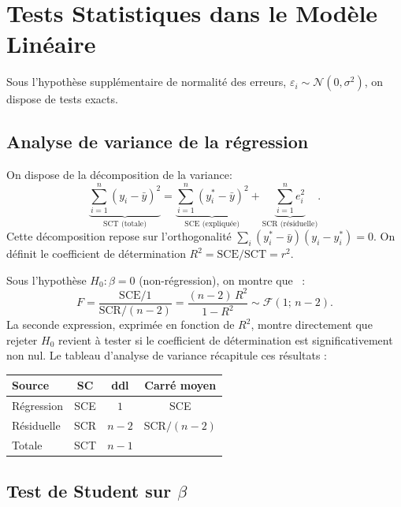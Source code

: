 \documentclass[12pt,a4paper]{article}
\theoremstyle{definition}
\theoremstyle{remark}
\newcommand{\ybar}{\bar{y}}
\begin{document}

\section{Tests Statistiques dans le Modèle Linéaire}
\label{sec:tests}

Sous l'hypothèse supplémentaire de normalité des erreurs,
$\varepsilon_i \sim \mathcal{N}(0, \sigma^2)$, on dispose de tests exacts.

\subsection{Analyse de variance de la régression}

On dispose de la décomposition de la variance:
\begin{equation}
  \label{eq:decomp}
  \underbrace{\sum_{i=1}^n (y_i - \ybar)^2}_{\text{SCT (totale)}}
  =
  \underbrace{\sum_{i=1}^n (y_i^* - \ybar)^2}_{\text{SCE (expliquée)}}
  +
  \underbrace{\sum_{i=1}^n e_i^2}_{\text{SCR (résiduelle)}}.
\end{equation}
Cette décomposition repose sur l'orthogonalité $\sum_i(y_i^*-\ybar)(y_i - y_i^*) = 0$.
On définit le coefficient de détermination $R^2 = \text{SCE}/\text{SCT} = r^2$.

Sous l'hypothèse $H_0 : \beta = 0$ (non-régression), on montre que~\cite{poly2024} :
\[
  F = \frac{\text{SCE}/1}{\text{SCR}/(n-2)}
    = \frac{(n-2)\,R^2}{1 - R^2}
    \sim \mathcal{F}(1;\, n-2).
\]
La seconde expression, exprimée en fonction de $R^2$, montre directement que
rejeter $H_0$ revient à tester si le coefficient de détermination est
significativement non nul.
Le tableau d'analyse de variance récapitule ces résultats :

\begin{center}
\begin{tabular}{lccc}
\toprule
\textbf{Source} & \textbf{SC} & \textbf{ddl} & \textbf{Carré moyen} \\
\midrule
Régression & SCE & $1$ & SCE \\
Résiduelle & SCR & $n-2$ & SCR$/(n-2)$ \\
\midrule
Totale & SCT & $n-1$ & \\
\bottomrule
\end{tabular}
\end{center}

\subsection{Test de Student sur $\beta$}
\end{document}
